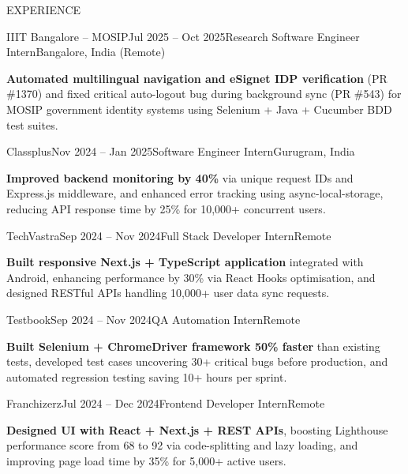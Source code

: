 \documentclass{resume} %
\begin{document}
\begin{rSection}{EXPERIENCE}
\begin{rSubsection}{IIIT Bangalore – MOSIP}{Jul 2025 – Oct 2025}{Research Software Engineer Intern}{Bangalore, India (Remote)}
\item \textbf{Automated multilingual navigation and eSignet IDP verification} (PR \#1370) and fixed critical auto-logout bug during background sync (PR \#543) for MOSIP government identity systems using Selenium + Java + Cucumber BDD test suites.
\end{rSubsection}

\begin{rSubsection}{Classplus}{Nov 2024 – Jan 2025}{Software Engineer Intern}{Gurugram, India}
\item \textbf{Improved backend monitoring by 40\%} via unique request IDs and Express.js middleware, and enhanced error tracking using async-local-storage, reducing API response time by 25\% for 10,000+ concurrent users.
\end{rSubsection}

\begin{rSubsection}{TechVastra}{Sep 2024 – Nov 2024}{Full Stack Developer Intern}{Remote}
\item \textbf{Built responsive Next.js + TypeScript application} integrated with Android, enhancing performance by 30\% via React Hooks optimisation, and designed RESTful APIs handling 10,000+ user data sync requests.
\end{rSubsection}

\begin{rSubsection}{Testbook}{Sep 2024 – Nov 2024}{QA Automation Intern}{Remote}
\item \textbf{Built Selenium + ChromeDriver framework 50\% faster} than existing tests, developed test cases uncovering 30+ critical bugs before production, and automated regression testing saving 10+ hours per sprint.
\end{rSubsection}

\begin{rSubsection}{Franchizerz}{Jul 2024 – Dec 2024}{Frontend Developer Intern}{Remote}
\item \textbf{Designed UI with React + Next.js + REST APIs}, boosting Lighthouse performance score from 68 to 92 via code-splitting and lazy loading, and improving page load time by 35\% for 5,000+ active users.
\end{rSubsection}
\end{rSection} 
\end{document}
